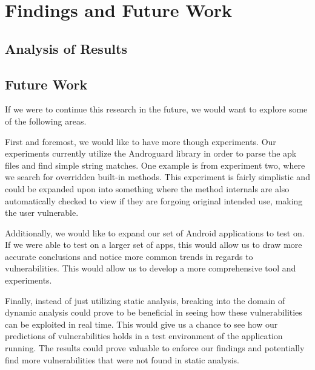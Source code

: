 \section{Findings and Future Work}
\label{sec:relwork}

\subsection{Analysis of Results}

\subsection{Future Work}
If we were to continue this research in the future, we would want to explore some of the following areas. 

First and foremost, we would like to have more though experiments. Our experiments currently utilize the Androguard library in order to parse the apk files 
and find simple string matches. One example is from experiment two, where we search for overridden built-in methods. This experiment is fairly simplistic 
and could be expanded upon into something where the method internals are also automatically checked to view if they are forgoing original intended use, making the user vulnerable.

Additionally, we would like to expand our set of Android applications to test on. If we were able to test on a larger set of apps, this would allow us to draw more accurate 
conclusions and notice more common trends in regards to vulnerabilities. This would allow us to develop a more comprehensive tool and experiments. 

Finally, instead of just utilizing static analysis, breaking into the domain of dynamic analysis could prove to be beneficial in seeing how these vulnerabilities can be exploited in real time. 
This would give us a chance to see how our predictions of vulnerabilities holds in a test environment of the application running. The results could prove valuable to enforce our findings and 
potentially find more vulnerabilities that were not found in static analysis. 
